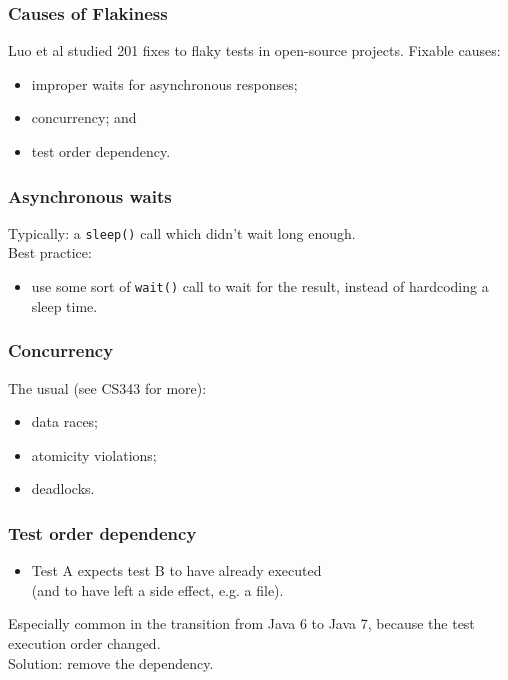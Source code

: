 \documentclass{beamer}
\newenvironment{changemargin}[1]{%
  \begin{list}{}{%
    \setlength{\topsep}{0pt}%
    \setlength{\leftmargin}{#1}%
    \setlength{\rightmargin}{1em}
    \setlength{\listparindent}{\parindent}%
    \setlength{\itemindent}{\parindent}%
    \setlength{\parsep}{\parskip}%
  }%
  \item[]}{\end{list}}
\begin{document}
\begin{frame}[fragile]
  \frametitle{Causes of Flakiness}
  \Large
  \begin{changemargin}{1cm}
    Luo et al studied 201 fixes to flaky tests in open-source projects. Fixable causes:
    \begin{itemize}
    \item improper waits for asynchronous responses;
    \item concurrency; and
    \item test order dependency.
    \end{itemize}
  \end{changemargin}
\end{frame}

\begin{frame}[fragile]
  \frametitle{Asynchronous waits}
  \Large
  \begin{changemargin}{1cm}
    Typically: a \texttt{sleep()} call which didn't wait long enough.\\[1em]
    Best practice:
    \begin{itemize}
      \item use some sort of \texttt{wait()} call to wait for the result,
        instead of hardcoding a sleep time.
    \end{itemize}
  \end{changemargin}
\end{frame}

\begin{frame}[fragile]
  \frametitle{Concurrency}
  \Large
  \begin{changemargin}{1cm}
    The usual (see CS343 for more):
    \begin{itemize}
    \item data races;
    \item atomicity violations;
    \item deadlocks.
    \end{itemize}
  \end{changemargin}
\end{frame}

\begin{frame}[fragile]
  \frametitle{Test order dependency}
  \Large
  \begin{changemargin}{1cm}
    \begin{itemize}
    \item Test A expects test B to have already executed \\
      (and to have left a side effect, e.g. a file).\\[1em]
    \end{itemize}
    Especially common in the transition from Java 6 to Java 7,
    because the test execution order changed.\\[1em]
    Solution: remove the dependency.
  \end{changemargin}
\end{frame}

  
\end{document}
